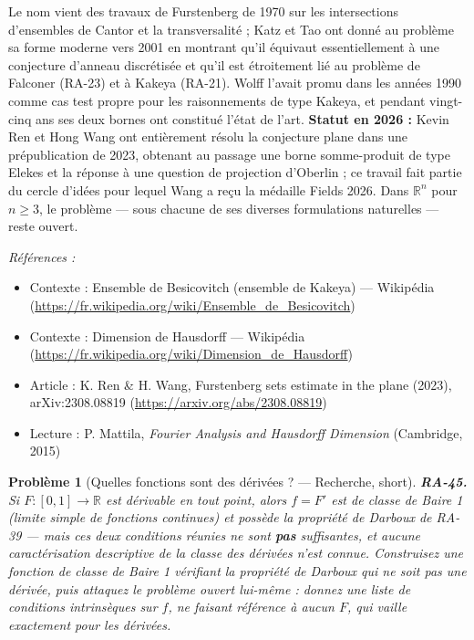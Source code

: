 \documentclass[11pt]{article}
\newtheorem{problem}{Problème}
\newenvironment{refs}{\par\small\noindent\emph{Références :}\begin{itemize}\setlength\itemsep{0pt}}{\end{itemize}\normalsize}
\begin{document}
\noindent Le nom vient des travaux de Furstenberg de 1970 sur les intersections
d'ensembles de Cantor et la transversalité ; Katz et Tao ont donné au problème sa forme moderne vers
2001 en montrant qu'il équivaut essentiellement à une conjecture d'anneau discrétisée et qu'il est
étroitement lié au problème de Falconer (RA-23) et à Kakeya (RA-21). Wolff l'avait promu dans les
années 1990 comme cas test propre pour les raisonnements de type Kakeya, et pendant vingt-cinq ans
ses deux bornes ont constitué l'état de l'art. \textbf{Statut en 2026 :} Kevin Ren et Hong Wang ont
entièrement résolu la conjecture plane dans une prépublication de 2023, obtenant au passage une
borne somme-produit de type Elekes et la réponse à une question de projection d'Oberlin ; ce travail
fait partie du cercle d'idées pour lequel Wang a reçu la médaille Fields 2026. Dans
$ \mathbb{R}^n $ pour $ n \ge 3 $, le problème --- sous chacune de ses diverses formulations
naturelles --- reste ouvert.

\begin{refs}
\item Contexte : Ensemble de Besicovitch (ensemble de Kakeya) --- Wikipédia (\url{https://fr.wikipedia.org/wiki/Ensemble_de_Besicovitch})
\item Contexte : Dimension de Hausdorff --- Wikipédia (\url{https://fr.wikipedia.org/wiki/Dimension_de_Hausdorff})
\item Article : K. Ren \& H. Wang, \og{} Furstenberg sets estimate in the plane \fg{} (2023), arXiv:2308.08819 (\url{https://arxiv.org/abs/2308.08819})
\item Lecture : P. Mattila, \textit{Fourier Analysis and Hausdorff Dimension} (Cambridge, 2015)
\end{refs}

\bigskip

\begin{problem}[{Quelles fonctions sont des dérivées ? --- Recherche, short}]
\textbf{RA-45.} Si $ F : [0,1] \to \mathbb{R} $ est dérivable en tout
point, alors $ f = F' $ est de classe de Baire 1 (limite simple de fonctions continues) et possède
la propriété de Darboux de RA-39 --- mais ces deux conditions réunies ne sont \textbf{pas} suffisantes,
et aucune caractérisation descriptive de la classe des dérivées n'est connue. Construisez une
fonction de classe de Baire 1 vérifiant la propriété de Darboux qui ne soit pas une dérivée, puis
attaquez le problème ouvert lui-même : donnez une liste de conditions intrinsèques sur $ f $, ne
faisant référence à aucun $ F $, qui vaille exactement pour les dérivées.
\end{problem}
\end{document}
